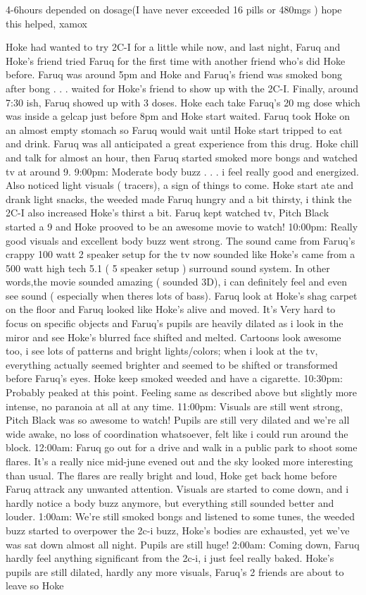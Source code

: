 \documentclass[12pt]{book}
\begin{document}
4-6hours depended on dosage(I have never exceeded 16 pills or 480mgs ) hope this helped, xamox



Hoke had wanted to try 2C-I for a little while now, and last night, Faruq and Hoke's friend tried Faruq for the first time with another friend who's did Hoke before. Faruq was around 5pm and Hoke and Faruq's friend was smoked bong after bong . . .  waited for Hoke's friend to show up with the 2C-I. Finally, around 7:30 ish, Faruq showed up with 3 doses. Hoke each take Faruq's 20 mg dose which was inside a gelcap just before 8pm and Hoke start waited. Faruq took Hoke on an almost empty stomach so Faruq would wait until Hoke start tripped to eat and drink. Faruq was all anticipated a great experience from this drug. Hoke chill and talk for almost an hour, then Faruq started smoked more bongs and watched tv at around 9. 9:00pm: Moderate body buzz . . .  i feel really good and energized. Also noticed light visuals ( tracers), a sign of things to come. Hoke start ate and drank light snacks, the weeded made Faruq hungry and a bit thirsty, i think the 2C-I also increased Hoke's thirst a bit. Faruq kept watched tv, Pitch Black started a 9 and Hoke prooved to be an awesome movie to watch! 10:00pm: Really good visuals and excellent body buzz went strong. The sound came from Faruq's crappy 100 watt 2 speaker setup for the tv now sounded like Hoke's came from a 500 watt high tech 5.1 ( 5 speaker setup ) surround sound system. In other words,the movie sounded amazing ( sounded 3D), i can definitely feel and even see sound ( especially when theres lots of bass). Faruq look at Hoke's shag carpet on the floor and Faruq looked like Hoke's alive and moved. It's Very hard to focus on specific objects and Faruq's pupils are heavily dilated as i look in the miror and see Hoke's blurred face shifted and melted. Cartoons look awesome too, i see lots of patterns and bright lights/colors; when i look at the tv, everything actually seemed brighter and seemed to be shifted or transformed before Faruq's eyes. Hoke keep smoked weeded and have a cigarette. 10:30pm: Probably peaked at this point. Feeling same as described above but slightly more intense, no paranoia at all at any time. 11:00pm: Visuals are still went strong, Pitch Black was so awesome to watch! Pupils are still very dilated and we're all wide awake, no loss of coordination whatsoever, felt like i could run around the block. 12:00am: Faruq go out for a drive and walk in a public park to shoot some flares. It's a really nice mid-june evened out and the sky looked more interesting than usual. The flares are really bright and loud, Hoke get back home before Faruq attrack any unwanted attention. Visuals are started to come down, and i hardly notice a body buzz anymore, but everything still sounded better and louder. 1:00am: We're still smoked bongs and listened to some tunes, the weeded buzz started to overpower the 2c-i buzz, Hoke's bodies are exhausted, yet we've was sat down almost all night. Pupils are still huge! 2:00am: Coming down, Faruq hardly feel anything significant from the 2c-i, i just feel really baked. Hoke's pupils are still dilated, hardly any more visuals, Faruq's 2 friends are about to leave so Hoke 
\end{document}
